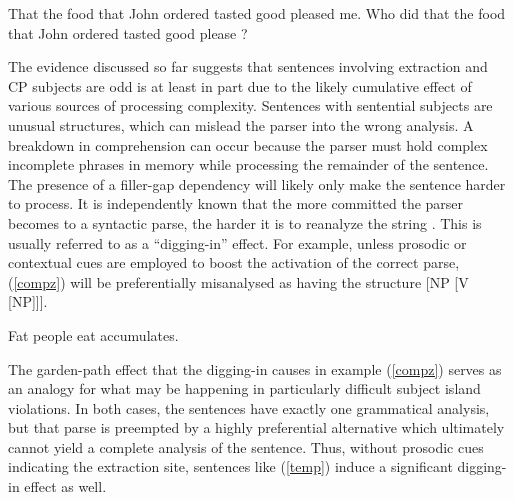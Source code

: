 \documentclass[output=paper]{langsci/langscibook}
\begin{document}
\ea
\ea That the food that John ordered tasted good pleased me.
\ex \bad{*}Who did that the food that John ordered tasted good please \spcs?
\z \label{v}
\z

The evidence discussed so far suggests that  sentences involving extraction and CP subjects  are odd 
is at least in part due to the likely cumulative effect of   various sources of  processing complexity. 
Sentences with sentential subjects are unusual structures, which can 
mislead the parser into the wrong analysis. A  breakdown in comprehension can occur
because the parser must hold complex incomplete phrases in memory
while processing the remainder of the sentence. The presence of a filler-gap dependency
will likely only make the sentence harder to process. 
It is independently known that the  more committed the parser 
becomes to a syntactic parse, the  harder it is to reanalyze the 
string \citep{ferreirahend,ferreirahend2,tabor3}.
This is usually referred to as a ``digging-in'' effect.
For example, unless prosodic or contextual cues  are employed to
boost the activation  of the correct  parse,   (\ref{compz}) will 
be preferentially  misanalysed as having the structure [NP [V [NP]]].

\ea Fat people eat accumulates.
\z \label{compz}

\noindent
The garden-path effect that the digging-in causes in example (\ref{compz}) serves as
 an  analogy for what may be happening in particularly difficult  subject island violations. 
In both cases,  the sentences have exactly one grammatical analysis, but that parse
 is preempted by a highly preferential alternative  which  ultimately cannot yield a 
 complete analysis of the sentence.  Thus, without prosodic cues indicating
 the extraction site, sentences like (\ref{temp}) induce a significant digging-in effect
 as well.


\eal
{}
 \label{temp}
\zl
\end{document}
